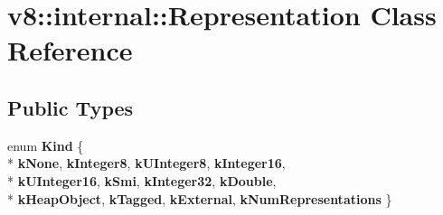 \hypertarget{classv8_1_1internal_1_1_representation}{}\section{v8\+:\+:internal\+:\+:Representation Class Reference}
\label{classv8_1_1internal_1_1_representation}
\subsection*{Public Types}
\begin{DoxyCompactItemize}
\item 
\hypertarget{classv8_1_1internal_1_1_representation_a08dbab898351309de7fa1fded4476d00}{}enum {\bfseries Kind} \{ \\*
{\bfseries k\+None}, 
{\bfseries k\+Integer8}, 
{\bfseries k\+U\+Integer8}, 
{\bfseries k\+Integer16}, 
\\*
{\bfseries k\+U\+Integer16}, 
{\bfseries k\+Smi}, 
{\bfseries k\+Integer32}, 
{\bfseries k\+Double}, 
\\*
{\bfseries k\+Heap\+Object}, 
{\bfseries k\+Tagged}, 
{\bfseries k\+External}, 
{\bfseries k\+Num\+Representations}
 \}\label{classv8_1_1internal_1_1_representation_a08dbab898351309de7fa1fded4476d00}

\end{DoxyCompactItemize}
